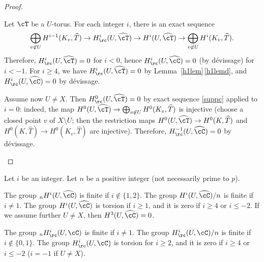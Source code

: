 \begin{proof}
\begin{enumeratea}
Let $\cT$ be a $U$-torus. For each integer $i$,
there is an exact sequence
\begin{equation} \label{suppc}
\bigoplus_{v \not \in U} H^{i-1}(K_v, \widehat T) \to
H^i_\rc(U, \widehat \cT) \to H^i(U, \widehat \cT) \to
\bigoplus_{v \not \in U} H^i(K_v, \widehat T).
\end{equation}
Therefore, $H^i_\rc(U,\widehat \cT)=0$ for $i <0$, hence
$H^i_\rc(U,\widehat \cC)=0$ (by dévissage) for $i <-1$.
For $i \geq 4$, we have
$H^i_\rc(U,\widehat \cT)=0$ by Lemma~\ref{h1lem}\,\eqref{h1lemd}, and
$H^i_\rc(U,\widehat \cC)=0$ by dévissage.

Assume now $U \neq X$. Then $H^0_\rc(U,\widehat \cT)=0$ by exact sequence
\eqref{suppc} applied to $i=0$: indeed, the map
$H^0(U,\widehat \cT) \to \bigoplus_{v \not \in U}
H^0(K_v,\widehat T)$ is injective (choose a closed point $v$ of
$X\setminus U$; then
the restriction maps $H^0(U, \widehat \cT) \to H^0(K,\widehat T)$
and $H^0(K,\widehat T) \to H^0(K_v,\widehat T)$ are injective).
Therefore, $H^{-1}_\rc(U, \widehat \cC)=0$
by dévissage.\qedhere
\end{enumeratea}
\end{proof}

\begin{prop} \label{finivanish2}
Let $i$ be an integer. Let $n$ be a positive integer (not necessarily prime
to $p$).
\begin{enumeratea}
\item\label{finivanish2a}
The group $_n H^i(U,\widehat \cC)$ is finite if $i \not \in
\{1, 2\}$. The group $H^i(U,\widehat \cC)/n$ is finite if
$i \neq 1$. The group $H^i(U,\widehat \cC)$ is torsion
if $i \geq 1$, and it is zero if $i \geq 4$ or $i \leq -2$. If we assume
further $U \neq X$, then $H^3(U,\widehat \cC)=0$.

\item\label{finivanish2b}
The group $_n H^i_\rc(U,\cC)$ is finite if $i \neq 1$.
The group $H^i_\rc(U,\cC)/n$ is finite if
$i \not \in \{0,1\}$.
The group $H^i_\rc(U,\cC)$ is torsion for $i \geq 2$, and it is
zero if $i \geq 4$ or $i \leq -2$ (\resp $i=-1$ if $U \neq X$).
\end{enumeratea}
\end{prop}

